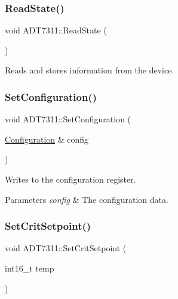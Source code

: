 \subsubsection{\texorpdfstring{Read\+State()}{ReadState()}}
{\footnotesize\ttfamily void A\+D\+T7311\+::\+Read\+State (\begin{DoxyParamCaption}{ }\end{DoxyParamCaption})}



Reads and stores information from the device. 

\mbox{\label{classcubesat_1_1ADT7311_adaafd79f27e3929eeba00c0a185d5b32}} 
\subsubsection{\texorpdfstring{Set\+Configuration()}{SetConfiguration()}}
{\footnotesize\ttfamily void A\+D\+T7311\+::\+Set\+Configuration (\begin{DoxyParamCaption}\item[{\hyperlink{unioncubesat_1_1ADT7311_1_1Configuration}{Configuration} \&}]{config }\end{DoxyParamCaption})}



Writes to the configuration register. 


\begin{DoxyParams}{Parameters}
{\em config} & The configuration data. \\
\hline
\end{DoxyParams}
\mbox{\label{classcubesat_1_1ADT7311_a5351ef5f5982332d1a8a08677f93e859}} 
\subsubsection{\texorpdfstring{Set\+Crit\+Setpoint()}{SetCritSetpoint()}}
{\footnotesize\ttfamily void A\+D\+T7311\+::\+Set\+Crit\+Setpoint (\begin{DoxyParamCaption}\item[{int16\+\_\+t}]{temp }\end{DoxyParamCaption})}



